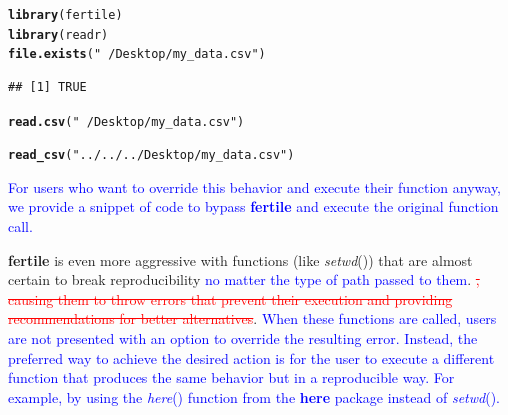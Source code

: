 \documentclass[APA,LATO1COL]{WileyNJD-v2}\usepackage[]{graphicx}\usepackage[]{color}
\makeatletter
\newcommand{\hlstr}[1]{\textcolor[rgb]{0.192,0.494,0.8}{#1}}%
\newcommand{\hlstd}[1]{\textcolor[rgb]{0.345,0.345,0.345}{#1}}%
\newcommand{\hlkwd}[1]{\textcolor[rgb]{0.737,0.353,0.396}{\textbf{#1}}}%
\newenvironment{kframe}{%
 \def\at@end@of@kframe{}%
 \ifinner\ifhmode%
  \def\at@end@of@kframe{\end{minipage}}%
  \begin{minipage}{\columnwidth}%
 \fi\fi%
 \def\FrameCommand##1{\hskip\@totalleftmargin \hskip-\fboxsep
 \colorbox{shadecolor}{##1}\hskip-\fboxsep
     \hskip-\linewidth \hskip-\@totalleftmargin \hskip\columnwidth}%
 \MakeFramed {\advance\hsize-\width
   \@totalleftmargin\z@ \linewidth\hsize
   \@setminipage}}%
 {\par\unskip\endMakeFramed%
 \at@end@of@kframe}
\newenvironment{knitrout}{}{} %
\newcommand{\pkg}[1]{\textbf{#1}}
\newcommand{\func}[1]{\textit{#1}()}
\makeatother
\begin{document}
\begin{knitrout}
\color{fgcolor}\begin{kframe}
\begin{alltt}
\hlkwd{library}\hlstd{(fertile)}
\hlkwd{library}\hlstd{(readr)}
\hlkwd{file.exists}\hlstd{(}\hlstr{"~/Desktop/my_data.csv"}\hlstd{)}
\end{alltt}
\begin{verbatim}
## [1] TRUE
\end{verbatim}
\begin{alltt}
\hlkwd{read.csv}\hlstd{(}\hlstr{"~/Desktop/my_data.csv"}\hlstd{)}
\end{alltt}


{\ttfamily\noindent\bfseries{}}\begin{alltt}
\hlkwd{read_csv}\hlstd{(}\hlstr{"../../../Desktop/my_data.csv"}\hlstd{)}
\end{alltt}


{\ttfamily\noindent\bfseries\color{errorcolor}{\#\# Error: Detected paths that lead outside the project directory. Such paths are not reproducible and will likely only work on your computer. If you would like to continue anyway, please execute the following command: readr::read\_csv('../../../Desktop/my\_data.csv')}}\end{kframe}
\end{knitrout}

\textcolor{blue}{For users who want to override this behavior and execute their function anyway, we provide a snippet of code to bypass \pkg{fertile} and execute the original function call.}

\pkg{fertile} is even more aggressive with functions (like \func{setwd}) that are almost certain to break reproducibility \textcolor{blue}{no matter the type of path passed to them}. \textcolor{red}{\st{, causing them to throw errors that prevent their execution and providing recommendations for better alternatives}}. \textcolor{blue}{When these functions are called, users are not presented with an option to override the resulting error. Instead, the preferred way to achieve the desired action is for the user to execute a different function that produces the same behavior but in a reproducible way. For example, by using the \func{here} function from the \pkg{here} package \citep{R-here} instead of \func{setwd}.}
\end{document}

